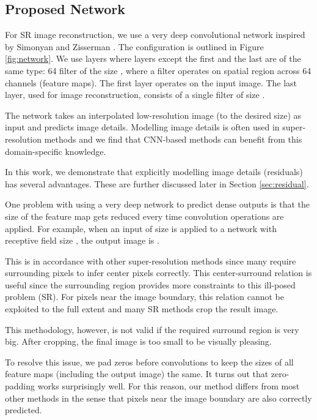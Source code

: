 \documentclass[10pt,twocolumn,letterpaper]{article}
\begin{document}
\subsection{Proposed Network}

For SR image reconstruction, we use a very deep convolutional network inspired by Simonyan and Zisserman \cite{simonyan2015very}. The configuration is outlined in Figure \ref{fig:network}. We use  layers where layers except the first and the last are of the same type: 64 filter of the size , where a filter operates on  spatial region across 64 channels (feature maps). The first layer operates on the input image. The last layer, used for image reconstruction, consists of a single filter of size .

The network takes an interpolated low-resolution image (to the desired size) as input and predicts image details. Modelling image details is often used in super-resolution methods \cite{Timofte2013, Timofte, bevilacqua2012,bevilacqua2013super} and we find that CNN-based methods can benefit from this domain-specific knowledge.

In this work, we demonstrate that explicitly modelling image details (residuals) has several advantages. These are further discussed later in Section \ref{sec:residual}. 

One problem with using a very deep network to predict dense outputs is that the size of the feature map gets reduced every time convolution operations are applied. For example,  when an input of size  is applied to a network with receptive field size , the output image is . 

This is in accordance with other super-resolution methods since many require surrounding pixels to infer center pixels correctly. This center-surround relation is useful since the surrounding region provides more constraints to this ill-posed problem (SR). For pixels near the image boundary, this relation cannot be exploited to the full extent and many SR methods crop the result image. 

This methodology, however, is not valid if the required surround region is very big. After cropping, the final image is too small to be visually pleasing.

To resolve this issue, we pad zeros before convolutions to keep the sizes of all feature maps (including the output image) the same. It turns out that zero-padding works surprisingly well. For this reason, our method differs from most other methods in the sense that pixels near the image boundary are also correctly predicted.  
\end{document}
